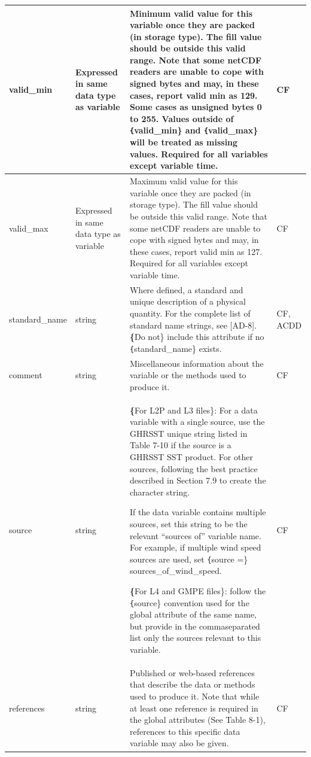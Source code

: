 \begin{longtable}{|p{}|p{}|p{}|p{}|}
\rowcolor{LightCyan} valid\_min & Expressed in same data type as variable & Minimum valid value for this variable once they are packed (in storage type). The fill value should be outside this valid range. Note that some netCDF readers are unable to cope with signed bytes and may, in these cases, report valid min as 129. Some cases as unsigned bytes 0 to 255. Values outside of \texttt\{valid\_min\} and \texttt\{valid\_max\} will be treated as missing values. Required for all variables except variable time. & CF \\ \hline

\rowcolor{LightCyan} valid\_max & Expressed in same data type as variable & Maximum valid value for this variable once
they are packed (in storage type). The fill
value should be outside this valid range. Note
that some netCDF readers are unable to cope
with signed bytes and may, in these cases,
report valid min as 127. Required for all
variables except variable time. & CF \\ \hline

\rowcolor{LightCyan} standard\_name & string & Where defined, a standard and unique
description of a physical quantity. For the
complete list of standard name strings, see
[AD-8]. \textbf\{Do not\} include this attribute if no
\texttt\{standard\_name\} exists. & CF, ACDD \\ \hline

\rowcolor{LightCyan} comment & string & Miscellaneous information about the variable or the methods used to produce it. & CF \\ \hline

\rowcolor{LightCyan} source & string & \textbf\{For L2P and L3 files\}: For a data variable with
a single source, use the GHRSST unique
string listed in Table 7-10 if the source is a
GHRSST SST product. For other sources,
following the best practice described in
Section 7.9 to create the character string.

If the data variable contains multiple sources,
set this string to be the relevant “sources of”
variable name. For example, if multiple wind
speed sources are used, set \texttt\{source =\}
sources\_of\_wind\_speed.

\textbf\{For L4 and GMPE files\}: follow the \texttt\{source\}
convention used for the global attribute of the
same name, but provide in the commaseparated list only the sources relevant to this
variable. & CF \\ \hline

\rowcolor{LightCyan} references & string & Published or web-based references that describe the data or methods used to produce it. Note that while at least one reference is required in the global attributes (See Table 8-1), references to this specific data variable may also be given. & CF \\ \hline


\end{longtable}
